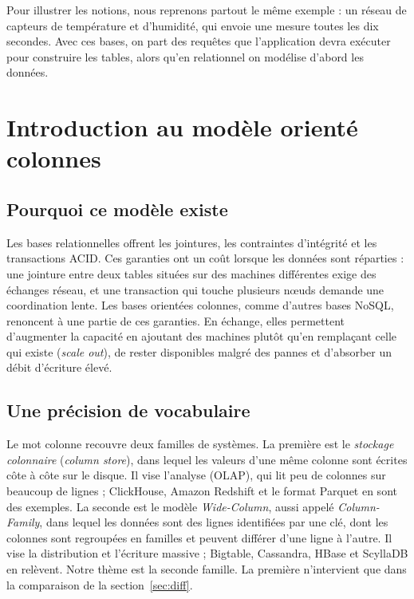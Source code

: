 \documentclass[11pt,a4paper]{article}
\begin{document}
Pour illustrer les notions, nous reprenons partout le même exemple : un réseau de capteurs de température et d'humidité, qui envoie une mesure toutes les dix secondes. Avec ces bases, on part des requêtes que l'application devra exécuter pour construire les tables, alors qu'en relationnel on modélise d'abord les données.

\section{Introduction au modèle orienté colonnes}

\subsection{Pourquoi ce modèle existe}
Les bases relationnelles offrent les jointures, les contraintes d'intégrité et les transactions ACID. Ces garanties ont un coût lorsque les données sont réparties : une jointure entre deux tables situées sur des machines différentes exige des échanges réseau, et une transaction qui touche plusieurs nœuds demande une coordination lente. Les bases orientées colonnes, comme d'autres bases NoSQL, renoncent à une partie de ces garanties. En échange, elles permettent d'augmenter la capacité en ajoutant des machines plutôt qu'en remplaçant celle qui existe (\emph{scale out}), de rester disponibles malgré des pannes et d'absorber un débit d'écriture élevé.

\subsection{Une précision de vocabulaire}
Le mot \og colonne \fg{} recouvre deux familles de systèmes. La première est le \emph{stockage colonnaire} (\emph{column store}), dans lequel les valeurs d'une même colonne sont écrites côte à côte sur le disque. Il vise l'analyse (OLAP), qui lit peu de colonnes sur beaucoup de lignes ; ClickHouse, Amazon Redshift et le format Parquet en sont des exemples. La seconde est le modèle \emph{Wide-Column}, aussi appelé \emph{Column-Family}, dans lequel les données sont des lignes identifiées par une clé, dont les colonnes sont regroupées en familles et peuvent différer d'une ligne à l'autre. Il vise la distribution et l'écriture massive ; Bigtable, Cassandra, HBase et ScyllaDB en relèvent. Notre thème est la seconde famille. La première n'intervient que dans la comparaison de la section~\ref{sec:diff}.
\end{document}
